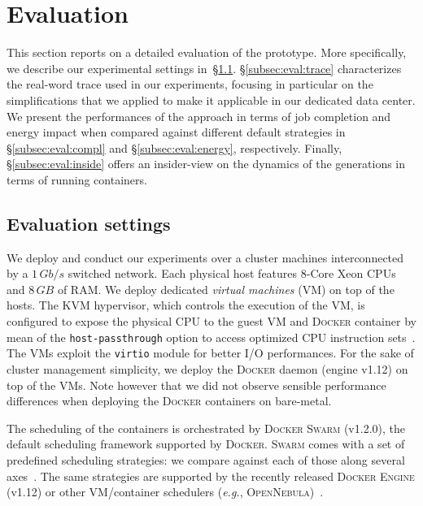 
\section{Evaluation}
\label{sec:evaluation}

This section reports on a detailed evaluation of the \GP prototype.
More specifically, we describe our experimental settings in~\S\ref{subsec:eval:settings}.
\S\ref{subsec:eval:trace} characterizes the real-word trace used in our experiments, focusing in particular on the simplifications that we applied to make it applicable in our dedicated data center.
We present the performances of the \GP approach in terms of job completion and energy impact when compared against different default strategies in \S\ref{subsec:eval:compl} and \S\ref{subsec:eval:energy}, respectively.
Finally, \S\ref{subsec:eval:inside} offers an insider-view on the dynamics of the generations in terms of running containers.

\subsection{Evaluation settings}
\label{subsec:eval:settings}

We deploy and conduct our experiments over a cluster machines interconnected by a $1\,Gb/s$ switched network.
Each physical host features 8-Core Xeon CPUs and $8\,GB$ of RAM.
We deploy dedicated \emph{virtual machines} (VM) on top of the hosts.
The KVM hypervisor, which controls the execution of the VM, is configured to expose the physical CPU to the guest VM and \textsc{Docker} container by mean of the \texttt{host-passthrough} option to access optimized CPU instruction sets~\cite{host-passthrough}.
The VMs exploit the \texttt{virtio} module for better I/O performances.
For the sake of cluster management simplicity, we deploy the \textsc{Docker} daemon (engine v1.12) on top of the VMs.
Note however that we did not observe sensible performance differences when deploying the \textsc{Docker} containers on bare-metal.

The scheduling of the containers is orchestrated by \textsc{Docker Swarm} (v1.2.0), the default scheduling framework supported by \textsc{Docker}.
\textsc{Swarm} comes with a set of predefined scheduling strategies: we compare \GP against each of those along several axes~\cite{docker-strategy}.
The same strategies are supported by the recently released \textsc{Docker Engine} (v1.12) or other VM/container schedulers (\textit{e.g.}, \textsc{OpenNebula})~\cite{opennebula}.

